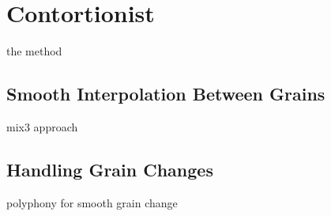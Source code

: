 \section{Contortionist}


the method

\subsection{Smooth Interpolation Between Grains}

mix3 approach

\subsection{Handling Grain Changes}
polyphony for smooth grain change
